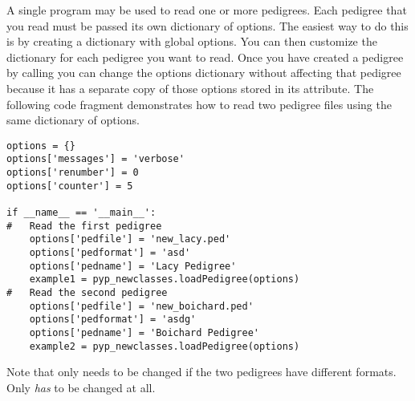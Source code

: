 A single \PyPedal{} program may be used to read one or more pedigrees.  Each pedigree that you read must be passed its own dictionary of options.  The easiest way to do this is by creating a dictionary with global options.  You can then customize the dictionary for each pedigree you want to read.  Once you have created a \PyPedal{} pedigree by calling  you can change the options dictionary without affecting that pedigree because it has a separate copy of those options stored in its  attribute.  The following code fragment demonstrates how to read two pedigree files using the same dictionary of options.
\begin{verbatim}
options = {}
options['messages'] = 'verbose'
options['renumber'] = 0
options['counter'] = 5

if __name__ == '__main__':
#   Read the first pedigree
    options['pedfile'] = 'new_lacy.ped'
    options['pedformat'] = 'asd'
    options['pedname'] = 'Lacy Pedigree'
    example1 = pyp_newclasses.loadPedigree(options)
#   Read the second pedigree
    options['pedfile'] = 'new_boichard.ped'
    options['pedformat'] = 'asdg'
    options['pedname'] = 'Boichard Pedigree'
    example2 = pyp_newclasses.loadPedigree(options)
\end{verbatim}
Note that  only needs to be changed if the two pedigrees have different formats.  Only  \emph{has} to be changed at all.

